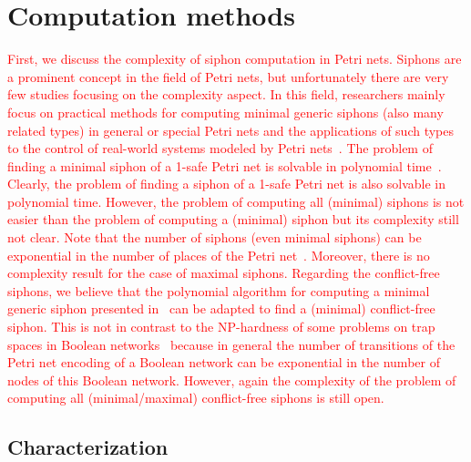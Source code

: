 \documentclass[preprint,12pt]{elsarticle}
\newcommand{\change}[1]{\textcolor{red}{#1}}
\begin{document}
\section{Computation methods}%
\label{sec:Computation}

\change{First, we discuss the complexity of siphon computation in Petri nets.
Siphons are a prominent concept in the field of Petri nets, but unfortunately there are very few studies focusing on the complexity aspect.
In this field, researchers mainly focus on practical methods for computing minimal generic siphons (also many related types) in general or special Petri nets and the applications of such types to the control of real-world systems modeled by Petri nets~\cite{DBLP:journals/isci/LiuB16}.
The problem of finding a minimal siphon of a 1-safe Petri net is solvable in polynomial time~\cite{tanimoto1996finding}.
Clearly, the problem of finding a siphon of a 1-safe Petri net is also solvable in polynomial time.
However, the problem of computing all (minimal) siphons is not easier than the problem of computing a (minimal) siphon but its complexity still not clear.
Note that the number of siphons (even minimal siphons) can be exponential in the number of places of the Petri net~\cite{DBLP:journals/isci/LiuB16}.
Moreover, there is no complexity result for the case of maximal siphons.
Regarding the conflict-free siphons, we believe that the polynomial algorithm for computing a minimal generic siphon presented in~\cite{tanimoto1996finding} can be adapted to find a (minimal) conflict-free siphon.
This is not in contrast to the NP-hardness of some problems on trap spaces in Boolean networks~\cite{moon2023computational} because in general the number of transitions of the Petri net encoding of a Boolean network can be exponential in the number of nodes of this Boolean network.
However, again the complexity of the problem of computing all (minimal/maximal) conflict-free siphons is still open.}

\subsection{Characterization}%
\label{subsec:siphon_characterization}
\end{document}
